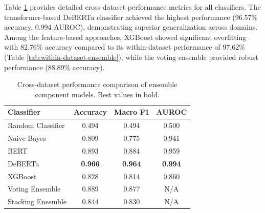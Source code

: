 \documentclass[11pt]{article}
\begin{document}
\begin{table}[t]
\centering
\footnotesize
{}
\caption{Within-dataset vs. cross-dataset performance comparison.}
\label{tab:cross-dataset-results}
\end{table}

Table \ref{tab:ensemble-component-results} provides detailed cross-dataset performance metrics for all classifiers. The transformer-based DeBERTa classifier achieved the highest performance (96.57\% accuracy, 0.994 AUROC), demonstrating superior generalization across domains. Among the feature-based approaches, XGBoost showed significant overfitting with 82.76\% accuracy compared to its within-dataset performance of 97.62\% (Table \ref{tab:within-dataset-ensemble}), while the voting ensemble provided robust performance (88.89\% accuracy).

\begin{table}[t]
\centering
\footnotesize
\begin{tabular}{@{}lccc@{}}
\toprule
\textbf{Classifier} & \textbf{Accuracy} & \textbf{Macro F1} & \textbf{AUROC} \\
\midrule
Random Classifier & 0.494 & 0.494 & 0.500 \\
\midrule
Naive Bayes & 0.809 & 0.775 & 0.941 \\
BERT & 0.893 & 0.884 & 0.959 \\
DeBERTa & \textbf{0.966} & \textbf{0.964} & \textbf{0.994} \\
XGBoost & 0.828 & 0.814 & 0.860 \\
Voting Ensemble & 0.889 & 0.877 & N/A \\
Stacking Ensemble & 0.844 & 0.830 & N/A \\
\bottomrule
\end{tabular}
\caption{Cross-dataset performance comparison of ensemble component models. Best values in bold.}
\label{tab:ensemble-component-results}
\end{table}
\end{document}
